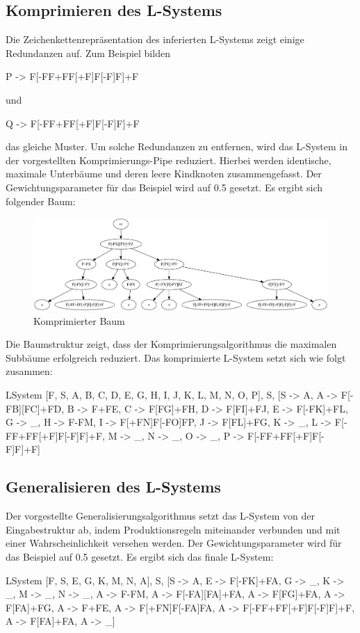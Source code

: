 \subsection*{Komprimieren des L-Systems}
Die Zeichenkettenrepräsentation des inferierten L-Systems zeigt einige Redundanzen auf.
Zum Beispiel bilden
\begin{csource}
    P -> F[-FF+FF[+F]F[-F]F]+F
\end{csource}
und
\begin{csource}
    Q -> F[-FF+FF[+F]F[-F]F]+F
\end{csource}
das gleiche Muster.
Um solche Redundanzen zu entfernen, wird das L-System in der vorgestellten Komprimierungs-Pipe reduziert.
Hierbei werden identische, maximale Unterbäume und deren leere Kindknoten zusammengefasst.
Der Gewichtungsparameter für das Beispiel wird auf 0.5 gesetzt.
Es ergibt sich folgender Baum:
\begin{figure}[H]
    \centering
    \includegraphics[width=14cm]{../images/compressed_tree.png}
    \caption{Komprimierter Baum}
\end{figure}

Die Baumstruktur zeigt, dass der Komprimierungsalgorithmus die maximalen Subbäume erfolgreich reduziert.
Das komprimierte L-System setzt sich wie folgt zusammen:
\begin{csource}
LSystem{
    [F, S, A, B, C, D, E, G, H, I, J, K, L, M, N, O, P],
    S,
    [S -> A, A -> F[-FB][FC]+FD, B -> F+FE, C -> F[FG]+FH, D -> F[FI]+FJ, E -> F[-FK]+FL, G -> _, H -> F-FM, I -> F[+FN]F[-FO]FP, J -> F[FL]+FG, K -> _, L -> F[-FF+FF[+F]F[-F]F]+F, M -> _, N -> _, O -> _, P -> F[-FF+FF[+F]F[-F]F]+F]
}
\end{csource}

\subsection*{Generalisieren des L-Systems}
Der vorgestellte Generalisierungsalgorithmus setzt das L-System von der Eingabestruktur ab, indem
Produktionsregeln miteinander verbunden und mit einer Wahrscheinlichkeit versehen werden.
Der Gewichtungsparameter wird für das Beispiel auf 0.5 gesetzt.
Es ergibt sich das finale L-System:
\begin{csource}
LSystem{
    [F, S, E, G, K, M, N, A],
    S,
    [S -> A, E -> F[-FK]+FA, G -> _, K -> _, M -> _, N -> _, A -> F-FM, A -> F[-FA][FA]+FA, A -> F[FG]+FA, A -> F[FA]+FG, A -> F+FE, A -> F[+FN]F[-FA]FA, A -> F[-FF+FF[+F]F[-F]F]+F, A -> F[FA]+FA, A -> _]
}
\end{csource}

